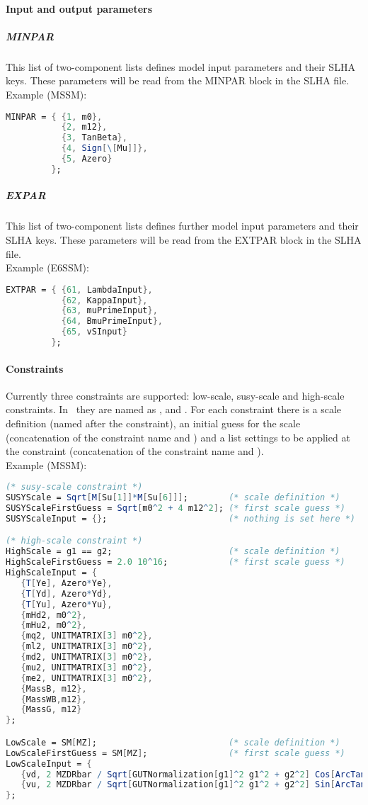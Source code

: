 \paragraph{Input and output parameters}

\subparagraph{MINPAR} This list of two-component lists defines model
input parameters and their SLHA keys.  These parameters will be read
from the MINPAR block in the SLHA file.
\\
Example (MSSM):
\begin{lstlisting}[language=Mathematica]
MINPAR = { {1, m0},
           {2, m12},
           {3, TanBeta},
           {4, Sign[\[Mu]]},
           {5, Azero}
         };
\end{lstlisting}

\subparagraph{EXPAR} This list of two-component lists defines further
model input parameters and their SLHA keys.  These parameters will be
read from the EXTPAR block in the SLHA file.
\\
Example (E6SSM):
\begin{lstlisting}[language=Mathematica]
EXTPAR = { {61, LambdaInput},
           {62, KappaInput},
           {63, muPrimeInput},
           {64, BmuPrimeInput},
           {65, vSInput}
         };
\end{lstlisting}

\paragraph{Constraints}
Currently three constraints are supported: low-scale, susy-scale and
high-scale constraints.  In \flexisusy\ they are named as
,  and .  For
each constraint there is a scale definition (named after the
constraint), an initial guess for the scale (concatenation of the
constraint name and ) and a list settings to be
applied at the constraint (concatenation of the constraint name and
).
\\
Example (MSSM):
\begin{lstlisting}[language=Mathematica]
(* susy-scale constraint *)
SUSYScale = Sqrt[M[Su[1]]*M[Su[6]]];        (* scale definition *)
SUSYScaleFirstGuess = Sqrt[m0^2 + 4 m12^2]; (* first scale guess *)
SUSYScaleInput = {};                        (* nothing is set here *)

(* high-scale constraint *)
HighScale = g1 == g2;                       (* scale definition *)
HighScaleFirstGuess = 2.0 10^16;            (* first scale guess *)
HighScaleInput = {
   {T[Ye], Azero*Ye},
   {T[Yd], Azero*Yd},
   {T[Yu], Azero*Yu},
   {mHd2, m0^2},
   {mHu2, m0^2},
   {mq2, UNITMATRIX[3] m0^2},
   {ml2, UNITMATRIX[3] m0^2},
   {md2, UNITMATRIX[3] m0^2},
   {mu2, UNITMATRIX[3] m0^2},
   {me2, UNITMATRIX[3] m0^2},
   {MassB, m12},
   {MassWB,m12},
   {MassG, m12}
};

LowScale = SM[MZ];                          (* scale definition *)
LowScaleFirstGuess = SM[MZ];                (* first scale guess *)
LowScaleInput = {
   {vd, 2 MZDRbar / Sqrt[GUTNormalization[g1]^2 g1^2 + g2^2] Cos[ArcTan[TanBeta]]},
   {vu, 2 MZDRbar / Sqrt[GUTNormalization[g1]^2 g1^2 + g2^2] Sin[ArcTan[TanBeta]]}
};
\end{lstlisting}

